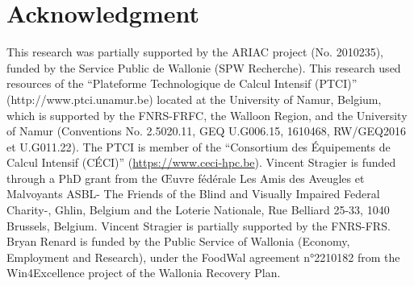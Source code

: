 \documentclass[conference,letterpaper]{IEEEtran}
\begin{document}
\section*{Acknowledgment}
This research was partially supported by the ARIAC project (No. 2010235), funded by the Service Public de Wallonie (SPW Recherche).
This research used resources of the “Plateforme Technologique de Calcul Intensif (PTCI)” (http://www.ptci.unamur.be) located at the University of Namur, Belgium, which is supported  by the FNRS-FRFC, the Walloon Region, and the University of Namur (Conventions No. 2.5020.11, GEQ U.G006.15, 1610468, RW/GEQ2016 et U.G011.22). The PTCI is member of the “Consortium des Équipements de Calcul Intensif  (CÉCI)” (\url{https://www.ceci-hpc.be}).
Vincent Stragier is funded through a PhD grant from the Œuvre fédérale Les Amis des Aveugles et Malvoyants ASBL- The Friends of the Blind and Visually Impaired Federal Charity-, Ghlin, Belgium and the Loterie Nationale, Rue Belliard 25-33, 1040 Brussels, Belgium. Vincent Stragier is partially supported by the FNRS-FRS.
Bryan Renard is funded by the Public Service of Wallonia (Economy, Employment and Research), under the FoodWal agreement n°2210182 from the Win4Excellence project of the Wallonia Recovery Plan.




\newpage
\appendix


\end{document}
